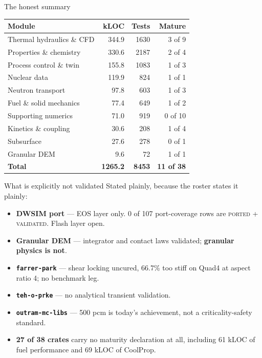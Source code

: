 \documentclass[aspectratio=169]{beamer}
\newcommand{\statustab}[1]{{\footnotesize\setlength{\tabcolsep}{4pt}#1}}
\begin{document}
\begin{frame}{The honest summary}
    \statustab{
    \begin{tabular}{lrrr}
        \toprule
        \textbf{Module} & \textbf{kLOC} & \textbf{Tests} & \textbf{Mature} \\
        \midrule
        Thermal hydraulics \& CFD      & 344.9 & 1630 & 3 of 9 \\
        Properties \& chemistry        & 330.6 & 2187 & 2 of 4 \\
        Process control \& twin        & 155.8 & 1083 & 1 of 3 \\
        Nuclear data                   & 119.9 &  824 & 1 of 1 \\
        Neutron transport              &  97.8 &  603 & 1 of 3 \\
        Fuel \& solid mechanics        &  77.4 &  649 & 1 of 2 \\
        Supporting numerics            &  71.0 &  919 & 0 of 10 \\
        Kinetics \& coupling           &  30.6 &  208 & 1 of 4 \\
        Subsurface                     &  27.6 &  278 & 0 of 1 \\
        Granular DEM                   &   9.6 &   72 & 1 of 1 \\
        \midrule
        \textbf{Total}                 & \textbf{1265.2} & \textbf{8453} & \textbf{11 of 38} \\
        \bottomrule
    \end{tabular}}
\end{frame}

\begin{frame}{What is explicitly not validated}
    Stated plainly, because the roster states it plainly:

    \medskip
    \begin{itemize}
        \item \textbf{DWSIM port} --- EOS layer only. 0 of 107 port-coverage
              rows are \textsc{ported + validated}. Flash layer open.
        \item \textbf{Granular DEM} --- integrator and contact laws validated;
              \textbf{granular physics is not}.
        \item \textbf{\texttt{farrer-park}} --- shear locking uncured, 66.7\%
              too stiff on Quad4 at aspect ratio 4; no benchmark leg.
        \item \textbf{\texttt{teh-o-prke}} --- no analytical transient
              validation.
        \item \textbf{\texttt{outram-mc-libs}} --- 500 pcm is today's
              achievement, not a criticality-safety standard.
        \item \textbf{27 of 38 crates} carry no maturity declaration at all,
              including 61 kLOC of fuel performance and 69 kLOC of CoolProp.
        \end{itemize}
\end{frame}
\end{document}
